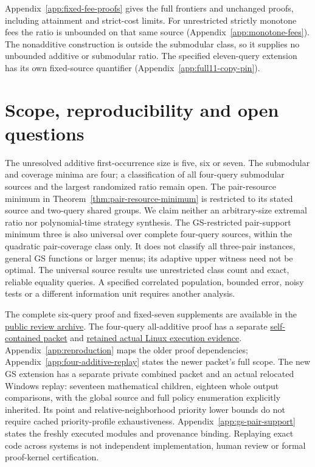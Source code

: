 \documentclass[pdflatex,sn-mathphys-num]{sn-jnl}
\theoremstyle{thmstyleone}
\theoremstyle{thmstylethree}
\theoremstyle{thmstyletwo}
\begin{document}
Appendix~\ref{app:fixed-fee-proofs} gives the full frontiers and
unchanged proofs, including attainment and strict-cost limits.
For unrestricted strictly monotone fees the ratio is unbounded on
that same source (Appendix~\ref{app:monotone-fees}). The nonadditive
construction is outside the submodular class, so it supplies no
unbounded additive or submodular ratio. The specified eleven-query
extension has its own fixed-source quantifier
(Appendix~\ref{app:full11-copy-pin}).

\section{Scope, reproducibility and open questions}
\label{sec:scope-core}
The unresolved additive first-occurrence size is five, six or seven.
The submodular and coverage minima are four; a classification of all
four-query submodular sources and the largest randomized ratio remain
open. The pair-resource minimum in Theorem~\ref{thm:pair-resource-minimum}
is restricted to its stated source and two-query shared groups. We claim
neither an arbitrary-size extremal ratio nor polynomial-time strategy synthesis.
The GS-restricted pair-support minimum three is also universal over
complete four-query sources, within the quadratic pair-coverage
class only. It does not classify all three-pair instances, general
GS functions or larger menus; its adaptive upper witness need not
be optimal.
The universal source results use unrestricted class count and exact,
reliable equality queries. A specified correlated population, bounded
error, noisy tests or a different information unit requires another analysis.

The complete six-query proof and fixed-seven supplements are available
in the \href{https://github.com/SHiJiE1115/newproj/releases/tag/complete-six-review-20261011-v01}{public review archive}.
The four-query all-additive proof has a separate
\href{https://github.com/SHiJiE1115/newproj/tree/837498553f02739d60d3c53f79b8141ac4f5e105/theory/four_query_additive_v01}{self-contained packet}
and \href{https://github.com/SHiJiE1115/newproj/tree/468d5a4df39611102c8b08aaecd8a05d6a6582b1/evidence/four_additive_hosted_v01}{retained actual Linux execution evidence}.
Appendix~\ref{app:reproduction} maps the older proof dependencies;
Appendix~\ref{app:four-additive-replay} states the newer packet's full
scope. The new GS extension has a separate private combined packet
and an actual relocated Windows replay: seventeen mathematical
children, eighteen whole output comparisons, with the global source
and full policy enumeration explicitly inherited. Its point and
relative-neighborhood priority lower bounds do not require cached
priority-profile exhaustiveness. Appendix~\ref{app:gs-pair-support}
states the freshly executed modules and provenance binding.
Replaying exact code across systems is not independent
implementation, human review or formal proof-kernel certification.
\end{document}
